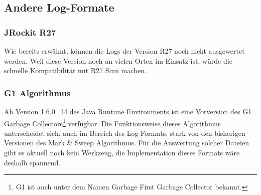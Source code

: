 \subsection{Andere Log-Formate}
\subsubsection{JRockit R27}\label{analyseumfang_jr27}
Wie bereits erwähnt, können die Logs der Version R27 noch nicht ausgewertet werden. Weil diese Version noch an vielen Orten im Einsatz ist, würde die schnelle Kompatibilität mit R27 Sinn machen.

\subsubsection{G1 Algorithmus}
Ab Version 1.6.0\_14 des Java Runtime Environments ist eine Vorversion des G1 Garbage Collectors\footnote{G1 ist auch unter dem Namen Garbage First Garbage Collector bekannt.} verfügbar. Die Funktionsweise dieses Algorithmus unterscheidet sich, auch im Bereich des Log-Formats, stark von den bisherigen Versionen des Mark \& Sweep Algorithmus. Für die Auswertung solcher Dateien gibt es aktuell noch kein Werkzeug, die Implementation dieses Formats wäre deshalb spannend.








